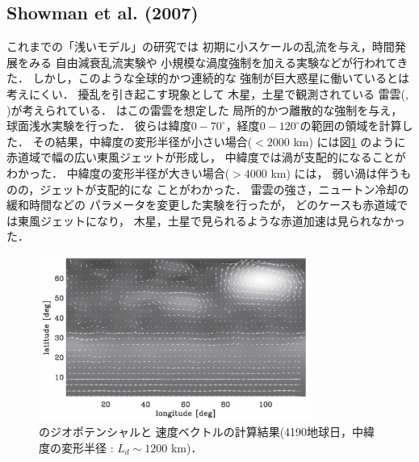 \documentclass[a4j,12pt,openbib,oneside]{jreport}
\begin{document}
\subsection{Showman et al. (2007)}
\label{sec:intro21}
これまでの「浅いモデル」の研究では
初期に小スケールの乱流を与え，時間発展をみる
自由減衰乱流実験\citep{Yoden1993}や
小規模な渦度強制を加える実験\citep{Scott2007}などが行われてきた．
%
しかし，このような全球的かつ連続的な
強制が巨大惑星に働いているとは考えにくい．
%
擾乱を引き起こす現象として
木星，土星で観測されている
雷雲(\cite{Gierasch2000}, \cite{Porco2005})が考えられている．
%
\cite{Showman2007}はこの雷雲を想定した
局所的かつ離散的な強制を与え，球面浅水実験を行った．
彼らは緯度$0 - 70^\circ$，経度$0 - 120^\circ$の範囲の領域を計算した．
その結果，中緯度の変形半径が小さい場合($< 2000$ km) には図\ref{fig3} のように
赤道域で幅の広い東風ジェットが形成し，
中緯度では渦が支配的になることがわかった．
%
中緯度の変形半径が大きい場合($> 4000$ km) には，
弱い渦は伴うものの，ジェットが支配的にな
ことがわかった．
%
雷雲の強さ，ニュートン冷却の緩和時間などの
パラメータを変更した実験を行ったが，
どのケースも赤道域では東風ジェットになり，
木星，土星で見られるような赤道加速は見られなかった．
%
\begin{figure}[H]
  \begin{center}
    \includegraphics[clip,width=9cm]{./fig/intro/fig3.png}
    \caption{
      \footnotesize{\cite{Showman2007}のジオポテンシャルと
速度ベクトルの計算結果(4190地球日，中緯度の変形半径 : $L_d \sim 1200$ km)．
      }
    }
    \label{fig3}
  \end{center}
\end{figure}
%
\end{document}
